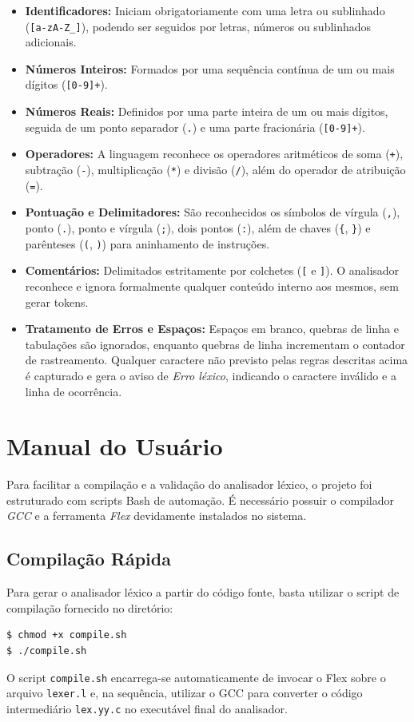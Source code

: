 \documentclass[a4paper, 12pt]{article}
\begin{document}
\begin{itemize}
    \item \textbf{Identificadores:} Iniciam obrigatoriamente com uma letra ou sublinhado (\verb|[a-zA-Z_]|), podendo ser seguidos por letras, números ou sublinhados adicionais.
    \item \textbf{Números Inteiros:} Formados por uma sequência contínua de um ou mais dígitos (\verb|[0-9]+|).
    \item \textbf{Números Reais:} Definidos por uma parte inteira de um ou mais dígitos, seguida de um ponto separador (\verb|.|) e uma parte fracionária (\verb|[0-9]+|).
    \item \textbf{Operadores:} A linguagem reconhece os operadores aritméticos de soma (\verb|+|), subtração (\verb|-|), multiplicação (\verb|*|) e divisão (\verb|/|), além do operador de atribuição (\verb|=|).
    \item \textbf{Pontuação e Delimitadores:} São reconhecidos os símbolos de vírgula (\verb|,|), ponto (\verb|.|), ponto e vírgula (\verb|;|), dois pontos (\verb|:|), além de chaves (\verb|{|, \verb|}|) e parênteses (\verb|(|, \verb|)|) para aninhamento de instruções.
    \item \textbf{Comentários:} Delimitados estritamente por colchetes (\verb|[| e \verb|]|). O analisador reconhece e ignora formalmente qualquer conteúdo interno aos mesmos, sem gerar tokens.
    \item \textbf{Tratamento de Erros e Espaços:} Espaços em branco, quebras de linha e tabulações são ignorados, enquanto quebras de linha incrementam o contador de rastreamento. Qualquer caractere não previsto pelas regras descritas acima é capturado e gera o aviso de \textit{Erro léxico}, indicando o caractere inválido e a linha de ocorrência.
\end{itemize}

\section{Manual do Usuário}

Para facilitar a compilação e a validação do analisador léxico, o projeto foi estruturado com scripts Bash de automação. É necessário possuir o compilador \textit{GCC} e a ferramenta \textit{Flex} devidamente instalados no sistema.

\subsection*{Compilação Rápida}
Para gerar o analisador léxico a partir do código fonte, basta utilizar o script de compilação fornecido no diretório:
\begin{verbatim}
$ chmod +x compile.sh
$ ./compile.sh
\end{verbatim}
O script \texttt{compile.sh} encarrega-se automaticamente de invocar o Flex sobre o arquivo \texttt{lexer.l} e, na sequência, utilizar o GCC para converter o código intermediário \texttt{lex.yy.c} no executável final do analisador.
\end{document}
